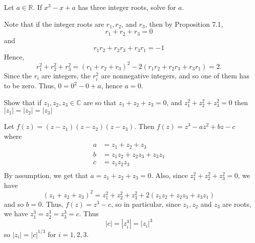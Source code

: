 \documentclass[11pt,dvipsnames]{book}
\def\C{{\mathbb{C}}}
\numberwithin{figure}{section} %
\numberwithin{table}{section} %
\begin{document}
\begin{exercise}
 Let $a\in \mathbb{R}$. If $x^{3}-x+a$ has three integer roots, solve for $a$.

\begin{solution}

Note that if the integer roots are $r_{1},r_{2}$, and $r_{3}$, then by Proposition 7.1,
\[
r_{1}+r_{2}+r_{3}=0\]
and
\[
r_{1}r_{2}+r_{2}r_{3}+r_{3}r_{1}=-1
\]
Hence,
\[
r_{1}^{2}+r_{2}^{2}+r_{3}^{2} = (r_{1}+r_{2}+r_{3})^{2}-2(r_{1}r_{2}+r_{2}r_{3}+r_{3}r_{1})=2.
\]
Since the $r_{i}$ are integers, the $r_{i}^{2}$ are nonnegative integers, and so one of them has to be zero. Thus, $0=0^{2}-0+a$, hence $a=0$.

\end{solution}

\end{exercise}

\begin{exercise} Show that if $z_1,z_2,z_3\in \C$ are so that $z_1+z_2+z_3=0$, and $z_1^2+z_2^2+z_3^2=0$ then $|z_1|=|z_2|=|z_3|$

\begin{solution}
Let $f(z)=(z-z_1)(z-z_2)(z-z_3)$. Then $f(z)=z^3-az^2+bz-c$ where
\begin{align*}
a&=z_1+z_2+z_3\\[4pt]
b&=z_1z_2+z_2z_3+z_3z_1\\[4pt]
c&=z_1z_2z_3\\[4pt]
\end{align*}
By assumption, we get that $a=z_1+z_2+z_3=0$.  Also, since $z_{1}^2+z_{2}^2+z_{3}^2=0$, we have
\[
(z_1+z_2+z_3)^2=z_1^2+z_2^2+z_3^2+2(z_1z_2+z_2z_3+z_3z_1)
\]
and so $b=0$. Thus, $f(z)=z^3-c$, so in particular, since $z_{1},z_{2}$ and $z_{3}$ are roots, we have $z_{1}^3=z_{2}^3=z_{3}^{3}=c$. Thus
\[
|c|=|z_{i}^3|=|z_{i}|^3
\]
so $|z_{i}|=|c|^{1/3}$ for $i=1,2,3$.
\end{solution}

\end{exercise}

%
%
%
%
\end{document}
